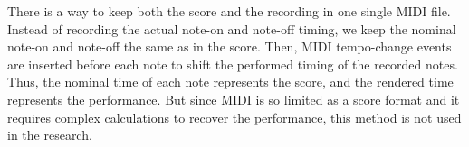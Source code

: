 There is a way to keep both the score and the recording in one single MIDI file. Instead of recording the actual note-on and note-off timing, we keep the nominal note-on and note-off the same as in the score. Then, MIDI tempo-change events are inserted before each note to shift the performed timing of the recorded notes. Thus, the nominal time of each note represents the score, and the rendered time represents the performance. But since MIDI is so limited as a score format and it requires complex calculations to recover the performance, this method is not used in the research.


